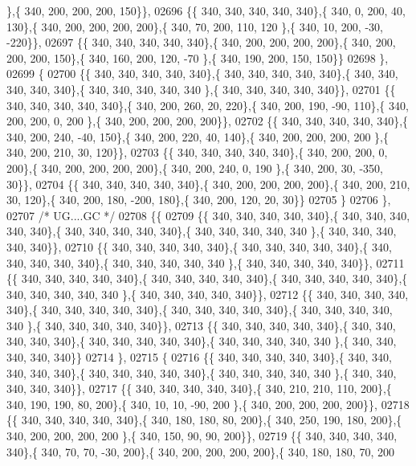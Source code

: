\begin{DoxyCode}
      \},\{ 340, 200, 200, 200, 150\}\},
02696 \{\{ 340, 340, 340, 340, 340\},\{ 340,   0, 200,  40, 130\},\{ 340, 200, 200, 200, 200\},\{ 340,  70, 200, 110, 120
      \},\{ 340,  10, 200, -30, -220\}\},
02697 \{\{ 340, 340, 340, 340, 340\},\{ 340, 200, 200, 200, 200\},\{ 340, 200, 200, 200, 150\},\{ 340, 160, 200, 120, -70
      \},\{ 340, 190, 200, 150, 150\}\}
02698 \},
02699 \{
02700 \{\{ 340, 340, 340, 340, 340\},\{ 340, 340, 340, 340, 340\},\{ 340, 340, 340, 340, 340\},\{ 340, 340, 340, 340, 340
      \},\{ 340, 340, 340, 340, 340\}\},
02701 \{\{ 340, 340, 340, 340, 340\},\{ 340, 200, 260,  20, 220\},\{ 340, 200, 190, -90, 110\},\{ 340, 200, 200,   0, 200
      \},\{ 340, 200, 200, 200, 200\}\},
02702 \{\{ 340, 340, 340, 340, 340\},\{ 340, 200, 240, -40, 150\},\{ 340, 200, 220,  40, 140\},\{ 340, 200, 200, 200, 200
      \},\{ 340, 200, 210,  30, 120\}\},
02703 \{\{ 340, 340, 340, 340, 340\},\{ 340, 200, 200,   0, 200\},\{ 340, 200, 200, 200, 200\},\{ 340, 200, 240,   0, 190
      \},\{ 340, 200,  30, -350,  30\}\},
02704 \{\{ 340, 340, 340, 340, 340\},\{ 340, 200, 200, 200, 200\},\{ 340, 200, 210,  30, 120\},\{ 340, 200, 180, -200, 
      180\},\{ 340, 200, 120,  20,  30\}\}
02705 \}
02706 \},
02707 \textcolor{comment}{/* UG....GC */}
02708 \{\{
02709 \{\{ 340, 340, 340, 340, 340\},\{ 340, 340, 340, 340, 340\},\{ 340, 340, 340, 340, 340\},\{ 340, 340, 340, 340, 340
      \},\{ 340, 340, 340, 340, 340\}\},
02710 \{\{ 340, 340, 340, 340, 340\},\{ 340, 340, 340, 340, 340\},\{ 340, 340, 340, 340, 340\},\{ 340, 340, 340, 340, 340
      \},\{ 340, 340, 340, 340, 340\}\},
02711 \{\{ 340, 340, 340, 340, 340\},\{ 340, 340, 340, 340, 340\},\{ 340, 340, 340, 340, 340\},\{ 340, 340, 340, 340, 340
      \},\{ 340, 340, 340, 340, 340\}\},
02712 \{\{ 340, 340, 340, 340, 340\},\{ 340, 340, 340, 340, 340\},\{ 340, 340, 340, 340, 340\},\{ 340, 340, 340, 340, 340
      \},\{ 340, 340, 340, 340, 340\}\},
02713 \{\{ 340, 340, 340, 340, 340\},\{ 340, 340, 340, 340, 340\},\{ 340, 340, 340, 340, 340\},\{ 340, 340, 340, 340, 340
      \},\{ 340, 340, 340, 340, 340\}\}
02714 \},
02715 \{
02716 \{\{ 340, 340, 340, 340, 340\},\{ 340, 340, 340, 340, 340\},\{ 340, 340, 340, 340, 340\},\{ 340, 340, 340, 340, 340
      \},\{ 340, 340, 340, 340, 340\}\},
02717 \{\{ 340, 340, 340, 340, 340\},\{ 340, 210, 210, 110, 200\},\{ 340, 190, 190,  80, 200\},\{ 340,  10,  10, -90, 200
      \},\{ 340, 200, 200, 200, 200\}\},
02718 \{\{ 340, 340, 340, 340, 340\},\{ 340, 180, 180,  80, 200\},\{ 340, 250, 190, 180, 200\},\{ 340, 200, 200, 200, 200
      \},\{ 340, 150,  90,  90, 200\}\},
02719 \{\{ 340, 340, 340, 340, 340\},\{ 340,  70,  70, -30, 200\},\{ 340, 200, 200, 200, 200\},\{ 340, 180, 180,  70, 200

\end{DoxyCode}
